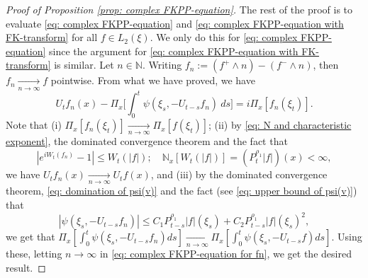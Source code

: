 \documentclass[EJP]{ejpecp} %
\begin{document}
\begin{proof}[Proof of Proposition \ref{prop: complex FKPP-equation}]
  	The rest of the proof is to evaluate \eqref{eq: complex FKPP-equation} and \eqref{eq: complex FKPP-equation with FK-transform} for all $f\in L_2(\xi)$. We only do this for \eqref{eq: complex FKPP-equation} since the argument for \eqref{eq: complex FKPP-equation with FK-transform} is similar.
  	Let $n \in \mathbb N$.
  	Writing $f_n := (f^+ \wedge n) - (f^- \wedge n)$, then $f_n \xrightarrow[n\to \infty]{} f$ pointwise.
  	From what we have proved, we have
\begin{equation}
\label{eq: complex FKPP-equation for fn}
    U_tf_n(x) - \Pi_{x} \Big[\int_0^t \psi (\xi_s, - U_{t-s}f_n ) ~ds\Big]
    = i \Pi_{x} [f_n(\xi_t)].
\end{equation}
	Note that
  	(i) $\Pi_{x}[f_n(\xi_t)] \xrightarrow[n\to \infty]{} \Pi_{x}[f(\xi_t)]$;
  	(ii) by \eqref{eq: N and characteristic exponent}, the dominated convergence theorem and the fact that
\[
     |e^{i W_t(f_n)} - 1| \leq W_t(|f|);
    \quad \mathbb N_x[W_t(|f|)] = (P_t^{\rho_1} |f|)(x) 
    < \infty,
\]
  	we have $U_tf_n(x) \xrightarrow[n\to \infty]{} U_tf(x)$, and (iii) by the dominated convergence theorem, \eqref{eq: domination of psi(v)} and the fact (see \eqref{eq: upper bound of psi(v)}) that
\[
    |\psi(\xi_s,- U_{t-s}f_n) |
    \leq C_1 P_{t-s}^{\rho_1}|f|(\xi_s)+C_2 P_{t-s}^{\rho_1}|f|(\xi_s)^2,
\]
  	we get that $\Pi_{x} [\int_0^t \psi(\xi_s,- U_{t-s}f_n)ds] \xrightarrow[n\to \infty]{} \Pi_{x} [\int_0^t \psi(\xi_s,- U_{t-s}f)ds]$.
  	Using these, letting $n \to \infty$ in \eqref{eq: complex FKPP-equation for fn}, we get the desired result.
\end{proof}
\end{document}
